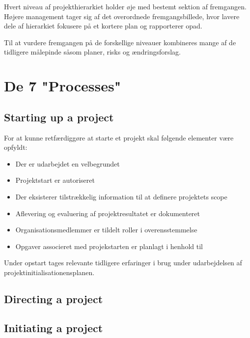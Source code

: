 \documentclass[12pt,twoside]{article}
\begin{document}
    Hvert niveau af projekthierarkiet holder øje med bestemt sektion af fremgangen. Højere management tager sig af det overordnede fremgangsbillede, hvor lavere dele af hierarkiet fokusere på et kortere plan og rapporterer opad.

    Til at vurdere fremgangen på de forskellige niveauer kombineres mange af de tidligere målepinde såsom planer, risks og ændringsforslag.

    \newpage

    \section{De 7 "Processes"}

    \subsection{Starting up a project}
    For at kunne retfærdiggøre at starte et projekt skal følgende elementer være opfyldt:

    \begin{itemize}
        \item Der er udarbejdet en velbegrundet 
        \item Projektstart er autoriseret
        \item Der eksisterer tilstrækkelig information til at definere projektets scope
        \item Aflevering og evaluering af projektresultatet er dokumenteret
        \item Organisationsmedlemmer er tildelt roller i overensstemmelse 
        \item Opgaver associeret med projekstarten er planlagt i henhold til 
    \end{itemize}

    Under opstart tages relevante tidligere erfaringer i brug under udarbejdelsen af projektinitialisationensplanen.

    \subsection{Directing a project}

    \subsection{Initiating a project}
\end{document}

